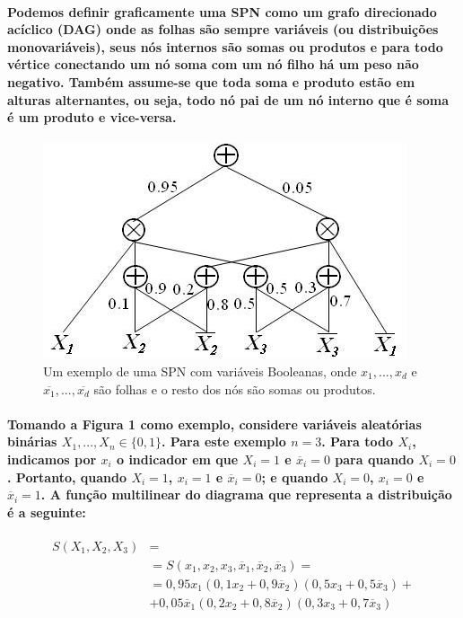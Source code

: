 \documentclass[a4paper,10pt]{article}
\theoremstyle{plain}
\begin{document}
\paragraph{
  Podemos definir graficamente uma SPN como um grafo direcionado acíclico (DAG) onde as 
folhas são sempre variáveis (ou distribuições monovariáveis), seus nós internos são somas ou 
produtos e para todo vértice conectando um nó soma com um nó filho há um peso não negativo. 
Também assume-se que toda soma e produto estão em alturas alternantes, ou seja, todo nó pai 
de um nó interno que é soma é um produto e vice-versa.
}

\begin{figure}[h]
\centering\includegraphics[scale=0.7]{imgs/domingos_poon.jpg}
\caption{Um exemplo de uma SPN com variáveis Booleanas, onde $x_1,...,x_d$ e 
  $\overline{x_1},...,\overline{x_d}$ são folhas e o resto dos nós são somas ou produtos.\cite{poon-domingos}}
\end{figure}

\paragraph{
  Tomando a Figura 1 como exemplo, considere variáveis aleatórias binárias $X_1,...,X_n \in \{0,1\}$. Para este
exemplo $n=3$. Para todo $X_i$, indicamos por $x_i$ o indicador em que $X_i=1$ e $\overline{x}_i=0$ para quando
$X_i=0$. Portanto, quando $X_i=1$, $x_i=1$ e $\overline{x}_i=0$; e quando $X_i=0$, $x_i=0$ e $\overline{x}_i=1$.
A função multilinear do diagrama que representa a distribuição é a seguinte:
} 

\begin{equation}
\begin{split}
S(X_1,X_2,X_3) & =\\
& =S(x_1,x_2,x_3,\overline{x}_1,\overline{x}_2,\overline{x}_3)=\\
& =0,95x_1(0,1x_2+0,9\overline{x}_2)(0,5x_3+0,5\overline{x}_3)+\\
& +0,05\overline{x}_1(0,2x_2+0,8\overline{x}_2)(0,3x_3+0,7\overline{x}_3)
\end{split}
\end{equation}
\end{document}
